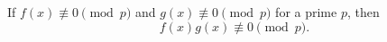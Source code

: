 If $f(x) \not\equiv 0 \pmod{p}$ and $g(x) \not\equiv 0 \pmod{p}$ for a prime $p$, then
$$f(x) g(x) \not\equiv 0 \pmod{p}.$$
